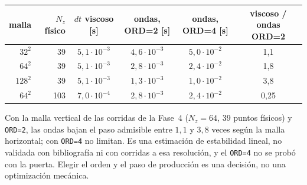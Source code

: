 \begin{center}\small
\begin{tabular}{rrcccc}
\toprule
malla & $N_z$ físico & $dt$ viscoso [s] & ondas, ORD=2 [s] & ondas, ORD=4 [s] & viscoso / ondas ORD=2\\
\midrule
$32^2$ & 39 & $5{,}1\cdot10^{-3}$ & $4{,}6\cdot10^{-3}$ & $5{,}0\cdot10^{-2}$ & 1{,}1\\
$64^2$ & 39 & $5{,}1\cdot10^{-3}$ & $2{,}8\cdot10^{-3}$ & $2{,}4\cdot10^{-2}$ & 1{,}8\\
$128^2$ & 39 & $5{,}1\cdot10^{-3}$ & $1{,}3\cdot10^{-3}$ & $1{,}0\cdot10^{-2}$ & 3{,}8\\
$64^2$ & 103 & $7{,}0\cdot10^{-4}$ & $2{,}8\cdot10^{-3}$ & $2{,}4\cdot10^{-2}$ & 0{,}25\\
\bottomrule
\end{tabular}
\end{center}

Con la malla vertical de las corridas de la Fase~4 ($N_z=64$, 39 puntos físicos) y
\texttt{ORD=2}, las ondas bajan el paso admisible entre $1{,}1$ y $3{,}8$ veces según la
malla horizontal; con \texttt{ORD=4} no limitan. Es una estimación de estabilidad lineal, no
validada con bibliografía ni con corridas a esa resolución, y el \texttt{ORD=4} no se probó
con la puerta. Elegir el orden y el paso de producción es una decisión, no una optimización
mecánica.
